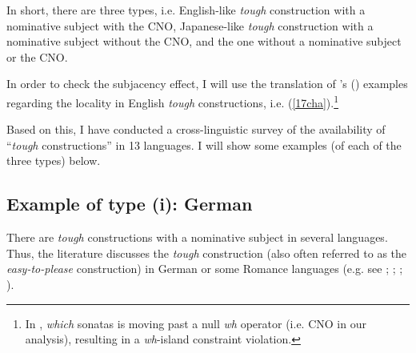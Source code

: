 \documentclass[output=paper,colorlinks,citecolor=brown,
]{langscibook}
\begin{document}
In short, there are three types, i.e. English-like \textit{tough} construction with a nominative subject with the CNO, Japanese-like \textit{tough} construction with a nominative subject without the CNO, and the one without a nominative subject or the CNO. 

In order to check the subjacency effect, I will use the translation of \citeauthor{Chomsky1977}’s (\citeyear{Chomsky1977}) examples regarding the locality in English \textit{tough} constructions, i.e. (\ref{17cha}).\footnote{In , \textit{which} sonatas is moving past a null \textit{wh} operator (i.e. CNO in our analysis), resulting in a \textit{wh}-island constraint violation.}

\begin{exe}
\ex \label{17ha}
\begin{xlist}
\ex \label{17bha}
\begin{xlist}

\end{xlist}
\ex \label{17cha}
\begin{xlist}

\end{xlist}

\ex 
\begin{xlist}

\end{xlist}
\end{xlist}
\end{exe}

Based on this, I have conducted a cross-linguistic survey of the availability of “\textit{tough} constructions” in 13 languages. I will show some examples (of each of the three types) below.

\subsection{Example of type (i): German} \label{s3.2ha}
There are \textit{tough} constructions with a nominative subject in several languages. Thus, the literature discusses the \textit{tough} construction (also often referred to as the \textit{easy-to-please} construction) in German or some Romance languages (e.g. see \citeauthor{MontalbettiMarioTravis1982} \citeyear{MontalbettiMarioTravis1982}; \citeauthor{Cinque1990} \citeyear{Cinque1990}; \citeauthor{Roberts1993} \citeyear{Roberts1993}; \citeauthor{Wurmbrand2001} \citeyear{Wurmbrand2001}).
\end{document}
